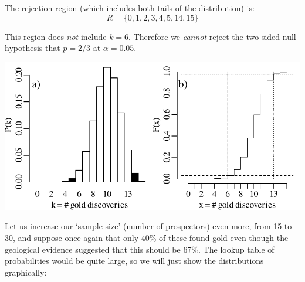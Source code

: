 The rejection region (which includes both tails of the distribution)
is:
\begin{equation}
  R=\{0,1,2,3,4,5,14,15\}
  \label{eq:2sidedbinomtest15}
\end{equation}

This region does \emph{not} include $k=6$. Therefore we \emph{cannot}
reject the two-sided null hypothesis that $p=2/3$ at
$\alpha=0.05$.\medskip

\noindent\begin{minipage}[t][][b]{.6\textwidth}
\includegraphics[width=\textwidth]{../figures/2sidedbinomialrejection15.pdf}
\medskip
\end{minipage}
\begin{minipage}[t][][t]{.4\textwidth}
  \label{fig:2sidedbinomialrejection15}
\end{minipage}

Let us increase our `sample size' (number of prospectors) even more,
from 15 to 30, and suppose once again that only 40\% of these found
gold even though the geological evidence suggested that this should be
67\%. The lookup table of probabilities would be quite large, so we
will just show the distributions graphically:\medskip

